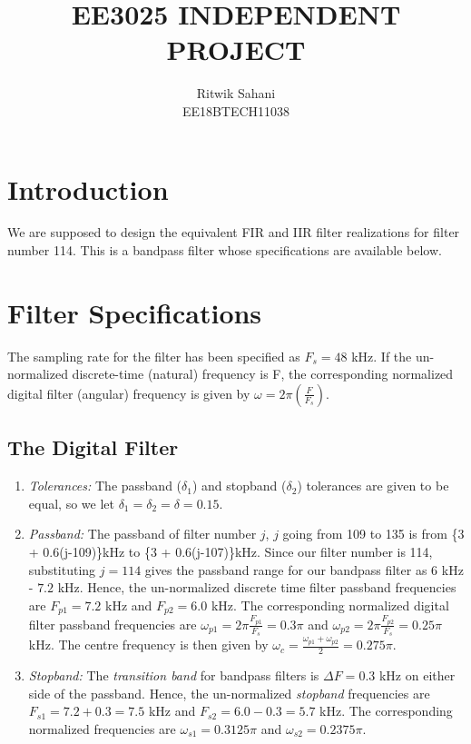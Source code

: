 \documentclass{article}
\begin{document}
\title{EE3025 INDEPENDENT PROJECT}

\author{Ritwik Sahani \\EE18BTECH11038}

\maketitle
\section{Introduction}
We are supposed to design the equivalent FIR and IIR filter realizations for filter number 114.  
This is a bandpass filter whose specifications are available below.

\section{Filter Specifications}
The sampling rate for the filter has been specified as $F_s =  48$ kHz.	If the un-normalized  discrete-time (natural) frequency is F, the corresponding normalized digital filter (angular) frequency is given by $\omega = 2\pi
\left(\frac{F}{F_s}\right)$.

\subsection{The Digital Filter}

\begin{enumerate}
\item {\em Tolerances:}  The passband ($\delta_1$) and stopband ($\delta_2$) tolerances are given to
be equal, so we let $\delta_1 = \delta_2 = \delta = 0.15$.

\item {\em Passband:}  The passband of filter number $j$, $j$ going from 109 to 135 is from \{3 + 0.6(j-109)\}kHz
to \{3 + 0.6(j-107)\}kHz.  Since our filter number is 114, substituting $j = 114$ gives the passband
range for our bandpass filter as $6$ kHz - $7.2$ kHz.  Hence, the un-normalized discrete time filter
passband frequencies are $F_{p1} = 7.2$ kHz
and $F_{p2} = 6.0$ kHz.  The corresponding normalized digital filter passband frequencies are
$\omega_{p1} = 2\pi\frac{F_{p1}}{F_s}  = 0.3\pi$  and $\omega_{p2} = 2\pi\frac{F_{p2}}{F_s}  = 0.25 \pi$ kHz.  The centre frequency is then given by  $\omega_c = \frac{\omega_{p1} + \omega_{p2}}{2} = 0.275\pi$.  

\item {\em Stopband:}  The {\em transition band} for bandpass filters is $\Delta F = 0.3$ kHz on either side of the passband.
Hence, the un-normalized {\em stopband} frequencies are $F_{s1} = 7.2 + 0.3 = 7.5$ kHz and $F	_{s2} = 6.0 - 0.3 = 5.7$ kHz.  The corresponding normalized frequencies are $\omega_{s1} = 0.3125 \pi$  and $\omega_{s2} =  0.2375 \pi$.
\end{enumerate}
\end{document}
